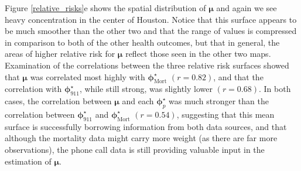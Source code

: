 \documentclass[final]{statsoc}
\begin{document}
Figure \ref{relative_risks}e shows the spatial distribution of $\boldsymbol\mu$ and again we see heavy concentration in the center of Houston. Notice that this surface appears to be much smoother than the other two and that the range of values is compressed in comparison to both of the other health outcomes, but that in general, the areas of higher relative risk for $\boldsymbol\mu$ reflect those seen in the other two maps. Examination of the correlations between the three relative risk surfaces showed that $\boldsymbol\mu$ was correlated most highly with $\boldsymbol\phi^\star_{\text{Mort}}$ $(r=0.82)$, and that the correlation with $\boldsymbol\phi^\star_{911}$, while still strong, was slightly lower $(r=0.68)$. In both cases, the correlation between $\boldsymbol\mu$ and each $\boldsymbol\phi^\star_p$ was much stronger than the correlation between $\boldsymbol\phi^\star_{911}$ and $\boldsymbol\phi^\star_{\text{Mort}}$ $(r=0.54)$, suggesting that this mean surface is successfully borrowing information from both data sources, and that although the mortality data might carry more weight (as there are far more observations), the phone call data is still providing valuable input in the estimation of $\boldsymbol\mu$. 
\end{document}
